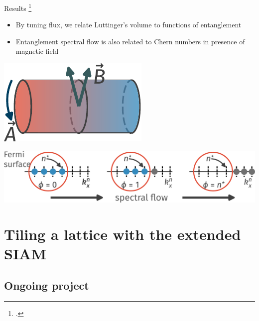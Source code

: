 \documentclass[aspectratio=169,t]{beamer}
\begin{document}
\begin{frame}{Results}
\footcite{oshikawa2000topological,seki2017topological,alexandradinata_2011}
\begin{minipage}{0.63\textwidth}
\begin{itemize}
	\item By tuning flux, we relate Luttinger's volume to functions of entanglement
	\item Entanglement spectral flow is also related to Chern numbers in presence of magnetic field
\end{itemize}
\end{minipage}
\hspace*{\fill}
\begin{minipage}{0.35\textwidth}
\includegraphics[width=\textwidth]{cylinder.pdf}
\end{minipage}

\vspace*{\fill}
\includegraphics[width=\textwidth]{spectral-flow.pdf}
\end{frame}

\section{Tiling a lattice with the extended SIAM}
\subsection{Ongoing project}
\end{document}
